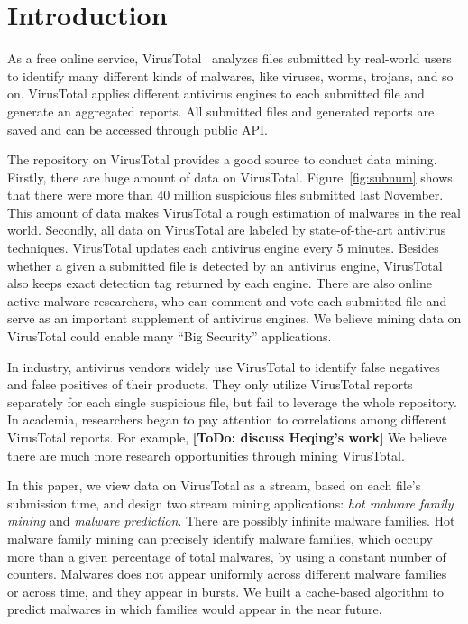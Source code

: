 \section{Introduction}

As a free online service, VirusTotal~\cite{virustotal} analyzes files submitted by real-world users to identify many different kinds of malwares, 
like viruses, worms, trojans, and so on. 
VirusTotal applies different antivirus engines to each submitted file and generate an aggregated reports. 
All submitted files and generated reports are saved and can be accessed through public API. 

The repository on VirusTotal provides a good source to conduct data mining. 
Firstly, there are huge amount of data on VirusTotal.
Figure~\ref{fig:subnum} shows that there were more than 40 million suspicious files 
submitted last November. 
This amount of data makes VirusTotal a rough estimation of malwares in the real world. 
Secondly, all data on VirusTotal are labeled by state-of-the-art antivirus techniques. 
VirusTotal updates each antivirus engine every 5 minutes. 
Besides whether a given a submitted file is detected by an antivirus engine, VirusTotal also keeps exact detection tag returned by each engine. 
There are also online active malware researchers, 
who can comment and vote each submitted file and serve as an important supplement of antivirus engines. 
We believe mining data on VirusTotal could enable many ``Big Security'' applications. 

In industry, antivirus vendors widely use VirusTotal to identify false negatives and false positives of their products. 
They only utilize VirusTotal reports separately for each single suspicious file, but fail to leverage the whole repository. 
In academia, researchers began to pay attention to correlations among different VirusTotal reports. 
For example, {\bf [ToDo: discuss Heqing's work]}
We believe there are much more research opportunities through mining VirusTotal. 

In this paper, we view data on VirusTotal as a stream, based on each file’s submission time, and design two stream mining applications: 
\textit{hot malware family mining} and \textit{malware prediction}. 
There are possibly infinite malware families. 
Hot malware family mining can precisely identify malware families, 
which occupy more than a given percentage of total malwares, by using a constant number of counters.
Malwares does not appear uniformly across different malware families or across time, 
and they appear in bursts. 
We built a cache-based algorithm to predict malwares in which families would appear in the near future. 

